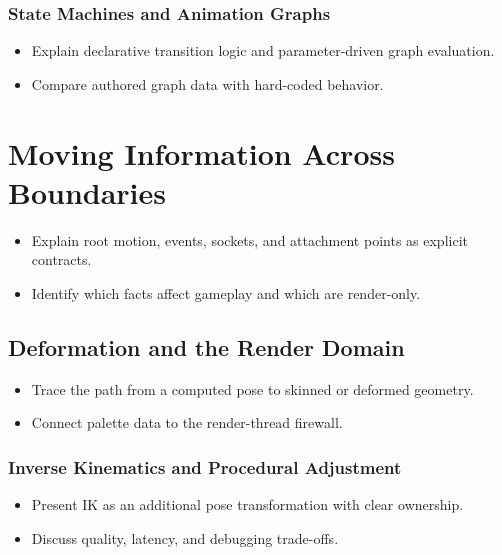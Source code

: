 \documentclass[
  11pt,
  letterpaper,
  DIV=11,
  numbers=noendperiod,
  twoside,
  open=right]{scrreprt}
\providecommand{\tightlist}{%
  \setlength{\itemsep}{0pt}\setlength{\parskip}{0pt}}
\begin{document}
\subsubsection{State Machines and Animation
Graphs}\label{state-machines-and-animation-graphs}

\begin{itemize}
\tightlist
\item
  Explain declarative transition logic and parameter-driven graph
  evaluation.
\item
  Compare authored graph data with hard-coded behavior.
\end{itemize}

\section{Moving Information Across
Boundaries}\label{moving-information-across-boundaries}

\begin{itemize}
\tightlist
\item
  Explain root motion, events, sockets, and attachment points as
  explicit contracts.
\item
  Identify which facts affect gameplay and which are render-only.
\end{itemize}

\subsection{Deformation and the Render
Domain}\label{deformation-and-the-render-domain}

\begin{itemize}
\tightlist
\item
  Trace the path from a computed pose to skinned or deformed geometry.
\item
  Connect palette data to the render-thread firewall.
\end{itemize}

\subsubsection{Inverse Kinematics and Procedural
Adjustment}\label{inverse-kinematics-and-procedural-adjustment}

\begin{itemize}
\tightlist
\item
  Present IK as an additional pose transformation with clear ownership.
\item
  Discuss quality, latency, and debugging trade-offs.
\end{itemize}
\end{document}
